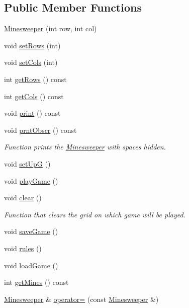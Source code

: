 \subsection*{Public Member Functions}
\begin{DoxyCompactItemize}
\item 
\hyperlink{class_minesweeper_a289ffbe6b9e6b728a19d1f73b78262e2}{Minesweeper} (int row, int col)
\item 
void \hyperlink{class_minesweeper_ab316cfe272f38e4768a6e45c171bce3a}{set\+Rows} (int)
\item 
void \hyperlink{class_minesweeper_a6e243fa0d9859fcf6dc4e45ec146b7df}{set\+Cols} (int)
\item 
int \hyperlink{class_minesweeper_abf6ccbfbecf96ef15f21ca7a94e98f1b}{get\+Rows} () const 
\item 
int \hyperlink{class_minesweeper_a82c571f6a7a80d001a3cb0a73445588f}{get\+Cols} () const 
\item 
void \hyperlink{class_minesweeper_ac158ba4f4bca146302059096db943dad}{print} () const 
\item 
void \hyperlink{class_minesweeper_ab90b8a53aee9758259e690bcb397bb1e}{prnt\+Obscr} () const 
\begin{DoxyCompactList}\small\item\em Function prints the \hyperlink{class_minesweeper}{Minesweeper} with spaces hidden. \end{DoxyCompactList}\item 
void \hyperlink{class_minesweeper_ac5ae43be99a0cc126da239d3572acbe7}{set\+Up\+G} ()
\item 
void \hyperlink{class_minesweeper_a98b38257079a4541fdb5ac8f1f9d25db}{play\+Game} ()
\item 
void \hyperlink{class_minesweeper_a9304b49877a6d02f6e5b9c5f48f34055}{clear} ()
\begin{DoxyCompactList}\small\item\em Function that clears the grid on which game will be played. \end{DoxyCompactList}\item 
void \hyperlink{class_minesweeper_ab8e0fb7bce67aa24dd2e616a2f37917d}{save\+Game} ()
\item 
void \hyperlink{class_minesweeper_aa7c5b407fa1907a07a29c9a04d23a3f2}{rules} ()
\item 
void \hyperlink{class_minesweeper_a11b4462ac060a000e79f5537b9ca9da2}{load\+Game} ()
\item 
int \hyperlink{class_minesweeper_ae83bf3ccb6d130ca8ef1ce642e1fc136}{get\+Mines} () const 
\item 
\hyperlink{class_minesweeper}{Minesweeper} \& \hyperlink{class_minesweeper_ad32e6a1ddc9ade6f3958c7568f994e9a}{operator=} (const \hyperlink{class_minesweeper}{Minesweeper} \&)
\end{DoxyCompactItemize}
